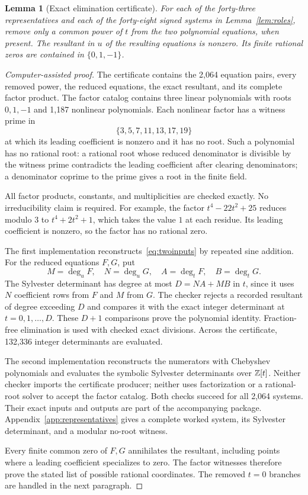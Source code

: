 \documentclass[11pt,letterpaper]{article}
\newtheorem{lemma}[theorem]{Lemma}
\theoremstyle{definition}\newtheorem{definition}[theorem]{Definition}
\theoremstyle{remark}\newtheorem{remark}[theorem]{Remark}
\begin{document}
\begin{lemma}[Exact elimination certificate]\label{lem:elimination}
For each of the forty-three representatives and each of the forty-eight signed systems in Lemma~\ref{lem:roles}, remove only a common power of $t$ from the two polynomial equations, when present. The resultant in $u$ of the resulting equations is nonzero. Its finite rational zeros are contained in $\{0,1,-1\}$.
\end{lemma}
\begin{proof}[Computer-assisted proof]
The certificate  contains the 2,064 equation pairs, every removed power, the reduced equations, the exact resultant, and its complete factor product. The factor catalog contains three linear polynomials with roots $0,1,-1$ and 1,187 nonlinear polynomials. Each nonlinear factor has a witness prime in
\[
 \{3,5,7,11,13,17,19\}
\]
at which its leading coefficient is nonzero and it has no root. Such a polynomial has no rational root: a rational root whose reduced denominator is divisible by the witness prime contradicts the leading coefficient after clearing denominators; a denominator coprime to the prime gives a root in the finite field.

All factor products, constants, and multiplicities are checked exactly. No irreducibility claim is required. For example, the factor $t^4-22t^2+25$ reduces modulo $3$ to $t^4+2t^2+1$, which takes the value $1$ at each residue. Its leading coefficient is nonzero, so the factor has no rational zero.

The first implementation reconstructs~\eqref{eq:twoinputs} by repeated sine addition. For the reduced equations $F,G$, put
\[
 M=\deg_uF,\quad N=\deg_uG,\quad A=\deg_tF,\quad B=\deg_tG.
\]
The Sylvester determinant has degree at most $D=NA+MB$ in $t$, since it uses $N$ coefficient rows from $F$ and $M$ from $G$. The checker rejects a recorded resultant of degree exceeding $D$ and compares it with the exact integer determinant at $t=0,1,\ldots,D$. These $D+1$ comparisons prove the polynomial identity. Fraction-free elimination is used with checked exact divisions. Across the certificate, 132,336 integer determinants are evaluated.

The second implementation reconstructs the numerators with Chebyshev polynomials and evaluates the symbolic Sylvester determinants over $\mathbb Z[t]$. Neither checker imports the certificate producer; neither uses factorization or a rational-root solver to accept the factor catalog. Both checks succeed for all 2,064 systems. Their exact inputs and outputs are part of the accompanying package. Appendix~\ref{app:representatives} gives a complete worked system, its Sylvester determinant, and a modular no-root witness.

Every finite common zero of $F,G$ annihilates the resultant, including points where a leading coefficient specializes to zero. The factor witnesses therefore prove the stated list of possible rational coordinates. The removed $t=0$ branches are handled in the next paragraph.
\end{proof}
\end{document}
